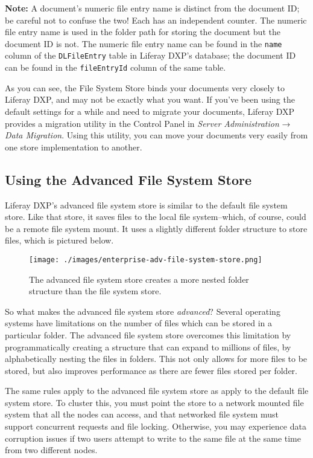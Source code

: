 \noindent\hrulefill

\textbf{Note:} A document's numeric file entry name is distinct from the
document ID; be careful not to confuse the two! Each has an independent
counter. The numeric file entry name is used in the folder path for
storing the document but the document ID is not. The numeric file entry
name can be found in the \texttt{name} column of the
\texttt{DLFileEntry} table in Liferay DXP's database; the document ID
can be found in the \texttt{fileEntryId} column of the same table.

\noindent\hrulefill

As you can see, the File System Store binds your documents very closely
to Liferay DXP, and may not be exactly what you want. If you've been
using the default settings for a while and need to migrate your
documents, Liferay DXP provides a migration utility in the Control Panel
in \emph{Server Administration} → \emph{Data Migration}. Using this
utility, you can move your documents very easily from one store
implementation to another.

\subsection{Using the Advanced File System
Store}\label{using-the-advanced-file-system-store}

Liferay DXP's advanced file system store is similar to the default file
system store. Like that store, it saves files to the local file
system--which, of course, could be a remote file system mount. It uses a
slightly different folder structure to store files, which is pictured
below.

\begin{figure}
\centering
\texttt{[image: ./images/enterprise-adv-file-system-store.png]}
\caption{The advanced file system store creates a more nested folder
structure than the file system store.}
\end{figure}

So what makes the advanced file system store \emph{advanced}? Several
operating systems have limitations on the number of files which can be
stored in a particular folder. The advanced file system store overcomes
this limitation by programmatically creating a structure that can expand
to millions of files, by alphabetically nesting the files in folders.
This not only allows for more files to be stored, but also improves
performance as there are fewer files stored per folder.

The same rules apply to the advanced file system store as apply to the
default file system store. To cluster this, you must point the store to
a network mounted file system that all the nodes can access, and that
networked file system must support concurrent requests and file locking.
Otherwise, you may experience data corruption issues if two users
attempt to write to the same file at the same time from two different
nodes.

